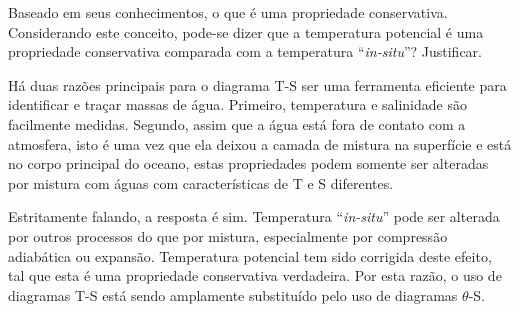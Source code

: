 \begin{questions}
  Baseado em seus conhecimentos,  o que é uma propriedade conservativa.
  Considerando este conceito, pode-se dizer que a temperatura potencial é uma
  propriedade conservativa comparada com a temperatura ``{\it in-situ}''?
  Justificar.

  \begin{solution}
    Há duas razões principais para  o diagrama T-S ser uma ferramenta eficiente para
    identificar e traçar  massas de água.  Primeiro, temperatura e salinidade são
    facilmente medidas.  Segundo, assim que a água está fora de contato com a
    atmosfera, isto é uma vez que ela deixou a camada de mistura na superfície e
    está no corpo principal do oceano, estas propriedades podem somente ser
    alteradas por mistura com águas com características de T e S diferentes.

    Estritamente falando, a resposta é sim.  Temperatura ``{\it in-situ}'' pode ser
    alterada por outros processos do que por mistura, especialmente por compressão adiabática ou expansão.  Temperatura potencial tem sido corrigida deste efeito,
    tal que esta é uma propriedade conservativa verdadeira.  Por esta razão, o uso
    de diagramas T-S está sendo amplamente substituído pelo uso de diagramas
    $\theta$-S.
  \end{solution}
\end{questions}

\begin{questions}
\end{questions}

